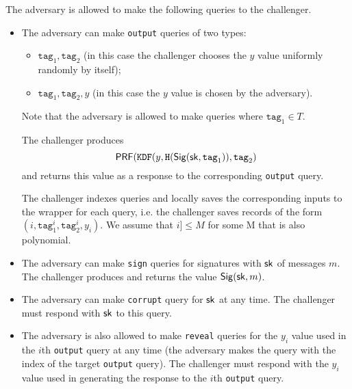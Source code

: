 \documentclass[12pt]{article}
\begin{document}


The adversary is allowed to make the following queries to the challenger.


\begin{itemize}
	
	\item The adversary can make \texttt{output} queries of two types:
	\begin{itemize}
		\item $\texttt{tag}_1, \texttt{tag}_2$ (in this case the challenger chooses the $y$ value uniformly randomly by itself);
		\item $\texttt{tag}_1, \texttt{tag}_2,y$ (in this case the $y$ value is chosen by the adversary).
	\end{itemize}
	
	Note that the adversary is allowed to make queries where $\texttt{tag}_1 \in T$. 
	
	The challenger produces $$
	\mathsf{PRF}(\texttt{KDF}(y, \texttt{H}(\mathsf{Sig} (\mathsf{sk},\texttt{tag}_1)), \texttt{tag}_2 )
	$$
	and returns this value as a response to the corresponding \texttt{output} query.
	
	The challenger indexes queries and locally saves the corresponding inputs to the wrapper for each query, i.e. the challenger saves records of the form $(i,\texttt{tag}_1^i,\texttt{tag}_2^i,y_i)$.  We assume that $i ]\le M$ for some M that is also polynomial.
	
	\item The adversary can make \texttt{sign} queries for signatures with $\mathsf{sk}$ of messages $m$. The challenger produces and returns the value $\mathsf{Sig} (\mathsf{sk}, m)$.
	
	\item The adversary can make \texttt{corrupt} query for $\mathsf{sk}$ at any time. The challenger must respond with $\mathsf{sk}$ to this query.
	
	\item The adversary is also allowed to make \texttt{reveal} queries for the $y_i$ value used in the $i$th \texttt{output} query at any time (the adversary makes the query with the index of the target \texttt{output} query). The challenger must respond with the $y_i$ value used in generating the response to the $i$th \texttt{output} query.
	

\end{itemize}
\end{document}
